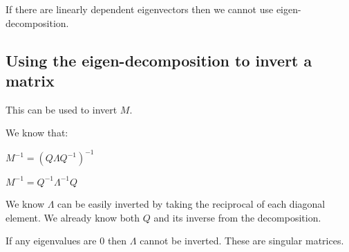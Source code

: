 If there are linearly dependent eigenvectors then we cannot use eigen-decomposition.

\subsection{Using the eigen-decomposition to invert a matrix}

This can be used to invert \(M\).

We know that:

$M^{-1}=(Q\Lambda Q^{-1})^{-1}$

$M^{-1}=Q^{-1}\Lambda^{-1}Q$

We know \(\Lambda \) can be easily inverted by taking the reciprocal of each diagonal element. We already know both \(Q\) and its inverse from the decomposition.

If any eigenvalues are \(0\) then \(\Lambda \) cannot be inverted. These are singular matrices.

